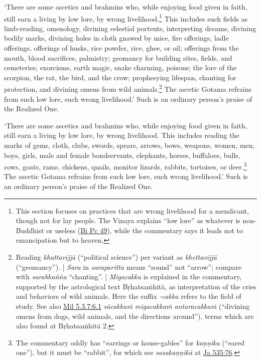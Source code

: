 \documentclass[12pt,openany]{book}%
\begin{document}
‘There are some ascetics and brahmins who, while enjoying food given in faith, still earn a living by low lore, by wrong livelihood.\footnote{This section focuses on practices that are wrong livelihood for a mendicant, though not for lay people. The Vinaya explains “low lore” as whatever is non-Buddhist or useless (\href{https://suttacentral.net/pli-tv-bi-vb-pc49/en/sujato}{Bi Pc 49}), while the commentary says it leads not to emancipation but to heaven. } This includes such fields as limb-reading, omenology, divining celestial portents, interpreting dreams, divining bodily marks, divining holes in cloth gnawed by mice, fire offerings, ladle offerings, offerings of husks, rice powder, rice, ghee, or oil; offerings from the mouth, blood sacrifices, palmistry; geomancy for building sites, fields, and cemeteries; exorcisms, earth magic, snake charming, poisons; the lore of the scorpion, the rat, the bird, and the crow; prophesying lifespan, chanting for protection, and divining omens from wild animals.\footnote{Reading \textit{\textsanskrit{khattavijjā}} (“political science”) per variant as \textit{\textsanskrit{khettavijjā}} (“geomancy”). | \textit{Sara} in \textit{saraparitta} means “sound” not “arrow”; compare with \textit{\textsanskrit{sarabhañña}} “chanting”. | \textit{Migacakka} is explained in the commentary, supported by the astrological text \textsanskrit{Bṛhatsaṁhitā}, as interpretation of the cries and behaviors of wild animals. Here the suffix \textit{-cakka} refers to the field of study. See also \href{https://suttacentral.net/mil5.3.7/en/sujato\#6.1}{Mil 5.3.7:6.1} \textit{\textsanskrit{sācakkaṁ} \textsanskrit{migacakkaṁ} \textsanskrit{antaracakkaṁ}} (“divining omens from dogs, wild animals, and the directions around”), terms which are also found at \textsanskrit{Bṛhatsaṁhitā} 2. } The ascetic Gotama refrains from such low lore, such wrong livelihood.’ Such is an ordinary person’s praise of the Realized One. 

‘There are some ascetics and brahmins who, while enjoying food given in faith, still earn a living by low lore, by wrong livelihood. This includes reading the marks of gems, cloth, clubs, swords, spears, arrows, bows, weapons, women, men, boys, girls, male and female bondservants, elephants, horses, buffaloes, bulls, cows, goats, rams, chickens, quails, monitor lizards, rabbits, tortoises, or deer.\footnote{The commentary oddly has “earrings or house-gables” for \textit{\textsanskrit{kaṇṇika}} (“eared one”), but it must be “rabbit”, for which see \textit{\textsanskrit{sasakaṇṇikā}} at \href{https://suttacentral.net/ja535/en/sujato\#76}{Ja 535:76}. } The ascetic Gotama refrains from such low lore, such wrong livelihood.’ Such is an ordinary person’s praise of the Realized One. 
\end{document}
